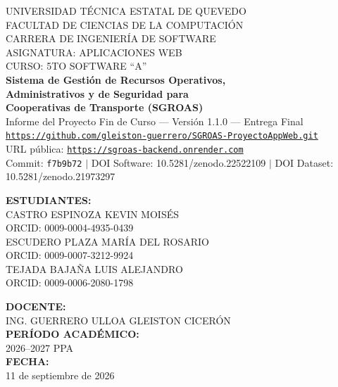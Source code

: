 \begin{titlepage}
\centering
\vspace*{0.6cm}

{\Large UNIVERSIDAD TÉCNICA ESTATAL DE QUEVEDO}\\[0.2cm]
{\Large FACULTAD DE CIENCIAS DE LA COMPUTACIÓN}\\[0.2cm]
{\Large CARRERA DE INGENIERÍA DE SOFTWARE}\\[0.4cm]
{\large ASIGNATURA: APLICACIONES WEB}\\[0.2cm]
{\large CURSO: 5TO SOFTWARE ``A''}\\[1.2cm]

{\LARGE \textbf{Sistema de Gestión de Recursos Operativos,}}\\[0.2cm]
{\LARGE \textbf{Administrativos y de Seguridad para}}\\[0.2cm]
{\LARGE \textbf{Cooperativas de Transporte (SGROAS)}}\\[0.6cm]
{\large Informe del Proyecto Fin de Curso --- Versión 1.1.0 --- Entrega Final}\\[0.4cm]
{\small \texttt{\href{https://github.com/gleiston-guerrero/SGROAS-ProyectoAppWeb.git}{https://github.com/gleiston-guerrero/SGROAS-ProyectoAppWeb.git}}}\\[0.2cm]
{\small URL pública: \texttt{\href{https://sgroas-backend.onrender.com}{https://sgroas-backend.onrender.com}}}\\[0.2cm]
{\small Commit: \texttt{f7b9b72} $\vert$ DOI Software: 10.5281/zenodo.22522109 $\vert$ DOI Dataset: 10.5281/zenodo.21973297}\\[1.0cm]

\begin{minipage}{0.5\textwidth}
\centering
\textbf{ESTUDIANTES:}\\[0.4cm]
CASTRO ESPINOZA KEVIN MOISÉS\\
\textsc{ORCID: 0009-0004-4935-0439}\\[0.3cm]
ESCUDERO PLAZA MARÍA DEL ROSARIO\\
\textsc{ORCID: 0009-0007-3212-9924}\\[0.3cm]
TEJADA BAJAÑA LUIS ALEJANDRO\\
\textsc{ORCID: 0009-0006-2080-1798}
\end{minipage}
\hfill
\begin{minipage}{0.4\textwidth}
\centering
\textbf{DOCENTE:}\\[0.4cm]
ING. GUERRERO ULLOA GLEISTON CICERÓN\\[0.8cm]
\textbf{PERÍODO ACADÉMICO:}\\
2026--2027 PPA\\[0.8cm]
\textbf{FECHA:}\\
11 de septiembre de 2026
\end{minipage}

\vfill
\end{titlepage}
